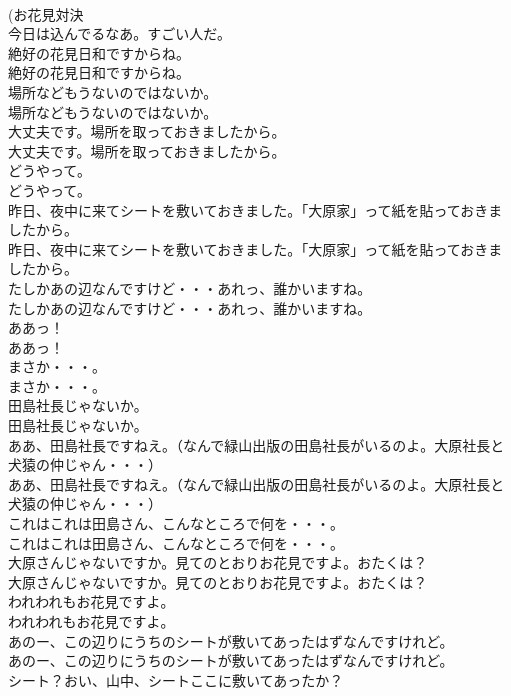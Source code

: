 \documentclass[8pt]{extreport}
\begin{document}
\begin{CJK}{UTF8}{min}
\\	(お花見対決 
\\	今日は込んでるなあ。すごい人だ。 
\\	絶好の花見日和ですからね。	
\\	絶好の花見日和ですからね。 
\\	場所などもうないのではないか。	
\\	場所などもうないのではないか。 
\\	大丈夫です。場所を取っておきましたから。	
\\	大丈夫です。場所を取っておきましたから。 
\\	どうやって。	
\\	どうやって。 
\\	昨日、夜中に来てシートを敷いておきました。「大原家」って紙を貼っておきましたから。	
\\	昨日、夜中に来てシートを敷いておきました。「大原家」って紙を貼っておきましたから。 
\\	たしかあの辺なんですけど・・・あれっ、誰かいますね。	
\\	たしかあの辺なんですけど・・・あれっ、誰かいますね。 
\\	ああっ！	
\\	ああっ！ 
\\	まさか・・・。	
\\	まさか・・・。 
\\	田島社長じゃないか。	
\\	田島社長じゃないか。 
\\	ああ、田島社長ですねえ。（なんで緑山出版の田島社長がいるのよ。大原社長と犬猿の仲じゃん・・・）	
\\	ああ、田島社長ですねえ。（なんで緑山出版の田島社長がいるのよ。大原社長と犬猿の仲じゃん・・・） 
\\	これはこれは田島さん、こんなところで何を・・・。	
\\	これはこれは田島さん、こんなところで何を・・・。 
\\	大原さんじゃないですか。見てのとおりお花見ですよ。おたくは？	
\\	大原さんじゃないですか。見てのとおりお花見ですよ。おたくは？ 
\\	われわれもお花見ですよ。	
\\	われわれもお花見ですよ。 
\\	あのー、この辺りにうちのシートが敷いてあったはずなんですけれど。	
\\	あのー、この辺りにうちのシートが敷いてあったはずなんですけれど。 
\\	シート？おい、山中、シートここに敷いてあったか？	

\end{CJK}
\end{document}
